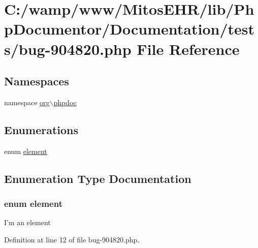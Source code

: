 \hypertarget{bug-904820_8php}{\section{\-C\-:/wamp/www/\-Mitos\-E\-H\-R/lib/\-Php\-Documentor/\-Documentation/tests/bug-\/904820.php \-File \-Reference}
\label{bug-904820_8php}
}
\subsection*{\-Namespaces}
\begin{DoxyCompactItemize}
\item 
namespace \hyperlink{namespaceorg_1_1phpdoc}{org$\backslash$phpdoc}
\end{DoxyCompactItemize}
\subsection*{\-Enumerations}
\begin{DoxyCompactItemize}
\item 
enum \hyperlink{bug-904820_8php_aa94081298ab2dfd0f261cce6c203d9aa}{element} 
\end{DoxyCompactItemize}


\subsection{\-Enumeration \-Type \-Documentation}
\hypertarget{bug-904820_8php_aa94081298ab2dfd0f261cce6c203d9aa}{
\subsubsection[{element}]{\setlength{\rightskip}{0pt plus 5cm}enum {\bf element}}}\label{bug-904820_8php_aa94081298ab2dfd0f261cce6c203d9aa}
\-I'm an element 

\-Definition at line 12 of file bug-\/904820.\-php.

